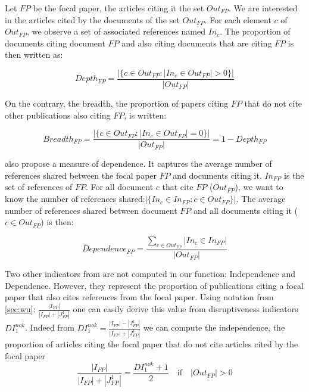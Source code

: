 \begin{figure}[h!]
  \centering
  
  \caption[\cite{bu2019multi} ]{\cite{bu2019multi} \footnotemark}
\end{figure}


Let $FP$ be the focal paper, the articles citing it the set $Out_{FP}$. We are interested in the articles cited by the documents of the set $Out_{FP}$. For each element $c$ of $Out_{FP}$, we observe a set of associated references named $In_c$.
The proportion of documents citing document $FP$ and also citing documents that are citing $FP$ is then written as: 

$$Depth_{FP} = \frac{|\{c \in Out_{FP} : |In_c \in Out_{FP}| >0\}|}{|Out_{FP}|}$$

On the contrary, the breadth, the proportion of papers citing $FP$ that do not cite other publications also citing $FP$, is written:

$$Breadth_{FP} = \frac{|\{c \in Out_{FP} : |In_c \in Out_{FP}| =0\}|}{|Out_{FP}|} = 1 - Depth_{FP}$$

\cite{bu2019multi} also propose a measure of dependence. It captures the average number of references shared between the focal paper $FP$ and documents citing it. $In_{FP}$ is the set of references of $FP$. For all document $c$ that cite $FP$ ($Out_{FP}$), we want to know the number of references shared:$|\{ In_c \in In_{FP}: c \in Out_{FP} \}|$. The average number of references shared between document $FP$ and all documents citing it ($c \in Out_{FP}$) is then:

$$Dependence_{FP} = \frac{\sum\limits_{c \in Out_{FP}}| In_c \in In_{FP}|}{|Out_{FP}|}$$





Two other indicators from \cite{bu2019multi} are not computed in our function: Independence and Dependence. However, they represent the proportion of publications citing a focal paper that also cites references from the focal paper. Using notation from \ref{sec:wu}: $\frac{|I_{FP}|}{|I_{FP}|+|J_{FP}^1|}$ one can easily derive this value from disruptiveness indicators $DI_1^{no k}$. Indeed from $DI_1^{no k} =  \frac{|I_{FP}|-|J_{FP}^1|}{|I_{FP}|+|J_{FP}^1|}$ we can compute the independence, the proportion of articles citing the focal paper that do not cite articles cited by the focal paper $$\frac{|I_{FP}|}{|I_{FP}|+|J_{FP}^1|} = \frac{DI_1^{no k}+1}{2} \quad\textrm{if}\quad |Out_{FP}| > 0$$

